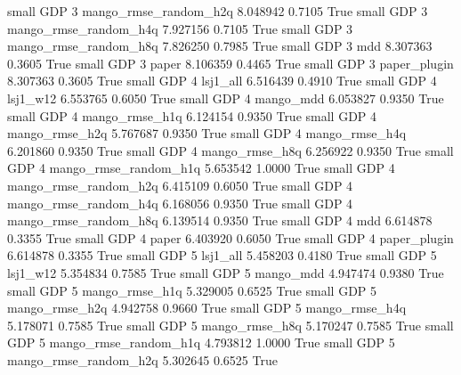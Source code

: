      small      GDP                 3 mango_rmse_random_h2q   8.048942      0.7105    True
     small      GDP                 3 mango_rmse_random_h4q   7.927156      0.7105    True
     small      GDP                 3 mango_rmse_random_h8q   7.826250      0.7985    True
     small      GDP                 3                   mdd   8.307363      0.3605    True
     small      GDP                 3                 paper   8.106359      0.4465    True
     small      GDP                 3          paper_plugin   8.307363      0.3605    True
     small      GDP                 4              lsj1_all   6.516439      0.4910    True
     small      GDP                 4              lsj1_w12   6.553765      0.6050    True
     small      GDP                 4             mango_mdd   6.053827      0.9350    True
     small      GDP                 4        mango_rmse_h1q   6.124154      0.9350    True
     small      GDP                 4        mango_rmse_h2q   5.767687      0.9350    True
     small      GDP                 4        mango_rmse_h4q   6.201860      0.9350    True
     small      GDP                 4        mango_rmse_h8q   6.256922      0.9350    True
     small      GDP                 4 mango_rmse_random_h1q   5.653542      1.0000    True
     small      GDP                 4 mango_rmse_random_h2q   6.415109      0.6050    True
     small      GDP                 4 mango_rmse_random_h4q   6.168056      0.9350    True
     small      GDP                 4 mango_rmse_random_h8q   6.139514      0.9350    True
     small      GDP                 4                   mdd   6.614878      0.3355    True
     small      GDP                 4                 paper   6.403920      0.6050    True
     small      GDP                 4          paper_plugin   6.614878      0.3355    True
     small      GDP                 5              lsj1_all   5.458203      0.4180    True
     small      GDP                 5              lsj1_w12   5.354834      0.7585    True
     small      GDP                 5             mango_mdd   4.947474      0.9380    True
     small      GDP                 5        mango_rmse_h1q   5.329005      0.6525    True
     small      GDP                 5        mango_rmse_h2q   4.942758      0.9660    True
     small      GDP                 5        mango_rmse_h4q   5.178071      0.7585    True
     small      GDP                 5        mango_rmse_h8q   5.170247      0.7585    True
     small      GDP                 5 mango_rmse_random_h1q   4.793812      1.0000    True
     small      GDP                 5 mango_rmse_random_h2q   5.302645      0.6525    True
